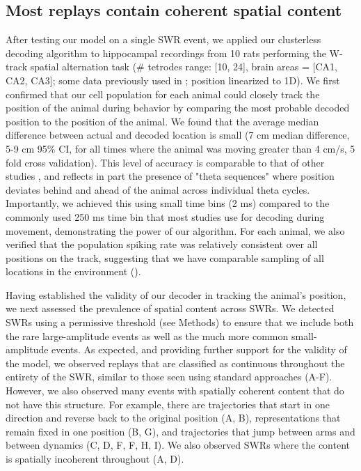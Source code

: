\documentclass[9pt,lineno]{elife}
\begin{document}
\subsection*{Most replays contain coherent spatial content}
After testing our model on a single SWR event, we applied our clusterless decoding algorithm to hippocampal recordings from 10 rats performing the W-track spatial alternation task (\# tetrodes range: [10, 24], brain areas = [CA1, CA2, CA3]; some data previously used in \cite{KarlssonAwakereplayremote2009, CarrTransientSlowGamma2012, KayConstantSubsecondCycling2020}; position linearized to 1D). We first confirmed that our cell population for each animal could closely track the position of the animal during behavior by comparing the most probable decoded position to the position of the animal. We found that the average median difference between actual and decoded location is small (7 cm median difference, 5-9 cm 95\% CI, for all times where the animal was moving greater than 4 cm/s, 5 fold cross validation). This level of accuracy is comparable to that of other studies \citep{DavidsonHippocampalReplayExtended2009, ShinDynamicsAwakeHippocampalPrefrontal2019, FarooqEmergencepreconfiguredplastic2019}, and reflects in part the presence of "theta sequences" \citep{DragoiTemporalEncodingPlace2006, FosterHippocampalthetasequences2007} where position deviates behind and ahead of the animal across individual theta cycles.  Importantly, we achieved this using small time bins (2 ms) compared to the commonly used 250 ms time bin that most studies use for decoding during movement, demonstrating the power of our algorithm. For each animal, we also verified that the population spiking rate was relatively consistent over all positions on the track, suggesting that we have comparable sampling of all locations in the environment ().

Having established the validity of our decoder in tracking the animal's position, we next assessed the prevalence of spatial content across SWRs. We detected SWRs using a permissive threshold (see Methods) to ensure that we include both the rare large-amplitude events as well as the much more common small-amplitude events. As expected, and providing further support for the validity of the model, we observed replays that are classified as continuous throughout the entirety of the SWR, similar to those seen using standard approaches (A-F). However, we also observed many events with spatially coherent content that do not have this structure. For example, there are trajectories that start in one direction and reverse back to the original position (A, B), representations that remain fixed in one position (B, G), and trajectories that jump between arms and between dynamics (C, D, F, F, H, I). We also observed SWRs where the content is spatially incoherent throughout (A, D).
\end{document}
